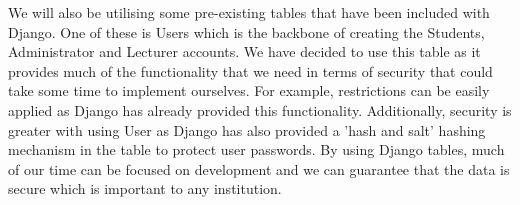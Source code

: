 	We will also be utilising some pre-existing tables that have been included with Django. One of these is Users which is the backbone of creating the Students, Administrator and Lecturer accounts. We have decided to use this table as it provides much of the functionality that we need in terms of security that could take some time to implement ourselves. For example, restrictions can be easily applied as Django has already provided this functionality. Additionally, security is greater with using User as Django has also provided a 'hash and salt' hashing mechanism in the table to protect user passwords. By using Django tables, much of our time can be focused on development and we can guarantee that the data is secure which is important to any institution.\\
	